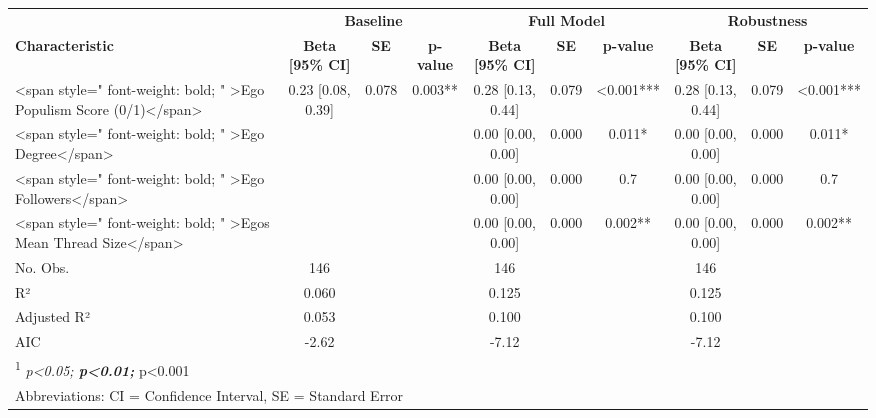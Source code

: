 
\begin{tabular}{lccccccccc}
\toprule
\multicolumn{1}{c}{ } & \multicolumn{3}{c}{\textbf{Baseline}} & \multicolumn{3}{c}{\textbf{Full Model}} & \multicolumn{3}{c}{\textbf{Robustness}} \\
\cmidrule(l{3pt}r{3pt}){2-4} \cmidrule(l{3pt}r{3pt}){5-7} \cmidrule(l{3pt}r{3pt}){8-10}
\textbf{Characteristic} & \textbf{Beta [95\% CI]} & \textbf{SE} & \textbf{p-value} & \textbf{Beta [95\% CI]} & \textbf{SE} & \textbf{p-value} & \textbf{Beta [95\% CI]} & \textbf{SE} & \textbf{p-value}\\
\midrule
<span style=" font-weight: bold;    " >Ego Populism Score (0/1)</span> & 0.23 [0.08, 0.39] & 0.078 & 0.003** & 0.28 [0.13, 0.44] & 0.079 & <0.001*** & 0.28 [0.13, 0.44] & 0.079 & <0.001***\\
<span style=" font-weight: bold;    " >Ego Degree</span> &  &  &  & 0.00 [0.00, 0.00] & 0.000 & 0.011* & 0.00 [0.00, 0.00] & 0.000 & 0.011*\\
<span style=" font-weight: bold;    " >Ego Followers</span> &  &  &  & 0.00 [0.00, 0.00] & 0.000 & 0.7 & 0.00 [0.00, 0.00] & 0.000 & 0.7\\
<span style=" font-weight: bold;    " >Egos Mean Thread Size</span> &  &  &  & 0.00 [0.00, 0.00] & 0.000 & 0.002** & 0.00 [0.00, 0.00] & 0.000 & 0.002**\\
\midrule
No. Obs. & 146 &  &  & 146 &  &  & 146 &  & \\
\addlinespace
R² & 0.060 &  &  & 0.125 &  &  & 0.125 &  & \\
Adjusted R² & 0.053 &  &  & 0.100 &  &  & 0.100 &  & \\
AIC & -2.62 &  &  & -7.12 &  &  & -7.12 &  & \\
\bottomrule
\multicolumn{10}{l}{\rule{0pt}{1em}\textsuperscript{1} \textit{p<0.05; \textbf{p<0.01; }}p<0.001}\\
\multicolumn{10}{l}{\rule{0pt}{1em}Abbreviations: CI = Confidence Interval, SE = Standard Error}\\
\end{tabular}
